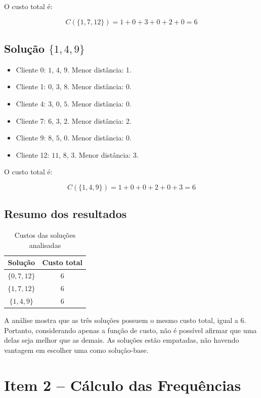 \documentclass[12pt,a4paper]{article}
\begin{document}
O custo total é:

\[
C(\{1,7,12\}) = 1+0+3+0+2+0 = 6
\]

\subsection{Solução $\{1,4,9\}$}

\begin{itemize}
    \item Cliente 0: $1$, $4$, $9$.
    Menor distância: 1.
    \item Cliente 1: $0$, $3$, $8$.
    Menor distância: 0.
    \item Cliente 4: $3$, $0$, $5$.
    Menor distância: 0.
    \item Cliente 7: $6$, $3$, $2$.
    Menor distância: 2.
    \item Cliente 9: $8$, $5$, $0$.
    Menor distância: 0.
    \item Cliente 12: $11$, $8$, $3$.
    Menor distância: 3.
\end{itemize}

O custo total é:

\[
C(\{1,4,9\}) = 1+0+0+2+0+3 = 6
\]

\subsection{Resumo dos resultados}

\begin{table}[H]
\centering
\caption{Custos das soluções analisadas}
\begin{tabular}{cc}
\toprule
\textbf{Solução} & \textbf{Custo total} \\
\midrule
$\{0,7,12\}$ & 6 \\
$\{1,7,12\}$ & 6 \\
$\{1,4,9\}$ & 6 \\
\bottomrule
\end{tabular}
\end{table}

A análise mostra que as três soluções possuem o mesmo
custo total, igual a 6. Portanto, considerando apenas
a função de custo, não é possível afirmar que uma delas
seja melhor que as demais. As soluções estão empatadas,
não havendo vantagem em escolher uma como solução-base.

\section{Item 2 -- Cálculo das Frequências}
\end{document}
